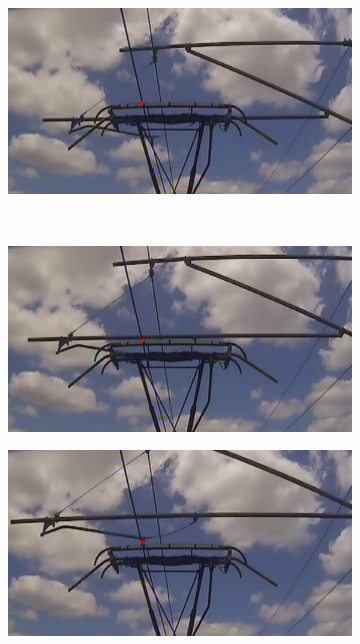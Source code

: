 \begin{figure}[ht]
\begin{subfigure}[b]{0.3\textwidth}
    \caption{}
  \end{subfigure}
  \hspace{3em}
  \begin{subfigure}[b]{0.3\textwidth}
    \centering
    \includegraphics[width=\textwidth]{images/q2_results_b4.png}
    \caption{}
  \end{subfigure}
  \\ \vspace{1em}
  \begin{subfigure}[b]{0.3\textwidth}
    \centering
    \includegraphics[width=\textwidth]{images/q2_results_b5.png}
    \caption{}
  \end{subfigure}
  \hspace{3em}
  \begin{subfigure}[b]{0.3\textwidth}
    \centering
    \includegraphics[width=\textwidth]{images/q2_results_b6.png}
    \caption{}
  \end{subfigure}
\end{figure}

